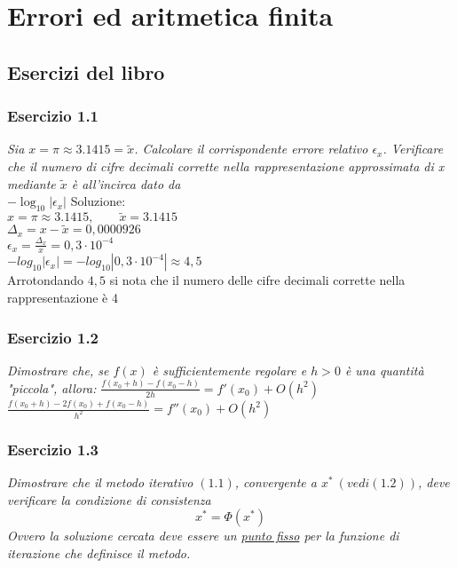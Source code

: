 \chapter{Errori ed aritmetica finita}
\label{chap:Errori ed aritmetica finita}
\section{Esercizi del libro}
\label{sec:Esercizi del libro}

\subsection{Esercizio 1.1}
\emph{Sia $ x = \pi \approx 3.1415 = \tilde{x} $. Calcolare il corrispondente errore relativo $\epsilon_{x}$.
Verificare che il numero di cifre decimali corrette nella rappresentazione approssimata di x mediante $\tilde{x}$ è all'incirca dato da}  \\

\center$-\log_{10}|\epsilon_{x}|$
\flushleft Soluzione:\\
\center
$ x = \pi \approx 3.1415, \qquad \tilde{x} = 3.1415 $ \\ \vspace{1ex}
$ \Delta_{x} = x - \tilde{x} = 0,0000926$ \\ \vspace{1ex}
$ \epsilon_{x} = \frac{\Delta_{x}}{x} = 0,3 \cdot 10^{-4} $\\ \vspace{1ex}
$ -log_{10} | \epsilon_{x} | = -log_{10} | 0,3 \cdot 10^{-4} | \approx 4,5  $\\ \vspace{1ex}
\flushleft Arrotondando $ 4,5 $ si nota che il numero delle cifre decimali corrette nella rappresentazione è 4


\subsection{Esercizio 1.2}
\emph{Dimostrare che, se $f(x)$ è sufficientemente regolare e $ h> 0 $ è una quantità "piccola", allora:}
\center$\frac{f(x_{0}+h)-f(x_{0}-h)}{2h} = f'(x_{0})+O(h^2)$ \\
\vspace{1em}
$\frac{f(x_{0}+h)-2f(x_{0})+f(x_{0}-h)}{h^2} = f''(x_{0})+O(h^2) $
\flushleft

\subsection{Esercizio 1.3}
\emph{Dimostrare che il metodo iterativo $(1.1) $, convergente a $ x^* \ (vedi(1.2)) $, deve verificare la condizione di consistenza}
$$ x^* =  \Phi(x^*)$$
\emph{Ovvero la soluzione cercata deve essere un \underline{punto fisso} per la funzione di iterazione che definisce il metodo.}

